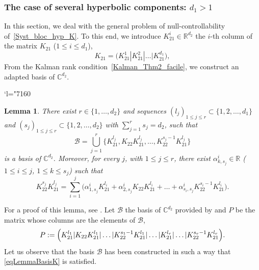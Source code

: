 \documentclass[JEP,XML,SOM,Unicode,NoEqCountersInSection]{cedram}
\let\mathcal\mathscr
\newcommand{\Changel}{\mathcode`l="7160}
\theoremstyle{plain}
\newtheorem{lemma}[theorem]{Lemma}
\theoremstyle{definition}
\theoremstyle{remark}
\newcommand{\set}{\mathbb}
\newcommand{\R}{} %
\renewcommand{\R}{\set{R}}
\renewcommand{\C}{\set{C}}
\newcommand{\coloneqq}{\mathrel{\mathord{:}\mathord=}}
\begin{document}
\subsubsection{The case of several hyperbolic components: $d_1 >1$}
\label{SectionKd1>1}

In this section, we deal with the general problem of null-controllability of~\eqref{Syst_bloc_hyp_K}. To this end, we introduce $K_{21}^i \in \R^{d_2}$ the $i$-th column of the matrix $K_{21}$ ($1 \leq i \leq d_1$), \ie
\[
K_{21} = \bigl(K_{21}^1 | K_{21}^2 | \dots | K_{21}^{d_1} \bigr),
\]
From the Kalman rank condition~\eqref{Kalman_Thm2_facile}, we construct an adapted basis of $\C^{d_2}$.

\Changel

\begin{lemma}
\label{AdaptedBasisLemma}
There exist $r \in \{1, \dots, d_2\}$ and sequences $(l_j)_{1 \leq j \leq r} \subset \{1, 2, \dots, d_1\}$ and $(s_j)_{1 \leq j \leq r} \subset \{1, 2, \dots, d_2\}$ with $\sum_{j=1}^r s_j =d_2$, such that
\[
\mathcal{B} = \bigcup\limits_{j=1}^{r} \bigl\{K_{21}^{l_j}, K_{22} K_{21}^{l_j}, \dots, K_{22}^{s_j-1} K_{21}^{l_j} \bigr\}
\]
is a basis of $\C^{d_2}$. Moreover, for every $j$, with $1 \leq j \leq r$, there exist $\alpha_{k,s_j}^i \in \R$ ($1 \leq i \leq j$, $1 \leq k \leq s_j$) such that
\begin{equation}
K_{22}^{s_j} K_{21}^{l_j} = \sum_{i=1}^j \bigl(\alpha_{1, s_j}^i K_{21}^{l_i} + \alpha_{2, s_j}^i K_{22} K_{21}^{l_i} + \dots + \alpha_{s_i,s_j}^i K_{22}^{s_i-1} K_{21}^{l_i}\bigr).
\label{eqLemmaBasisK}
\end{equation}
\end{lemma}

For a proof of this lemma, see \cite[Lem.\,3.1]{ammarkhodja_2009a}. Let $\mathcal{B}$ the basis of $\C^{d_2}$ provided by  and $P$ be the matrix whose columns are the elements of $\mathcal{B}$, \ie
\[
P \coloneqq \Bigl(K_{21}^{l_1} | K_{22} K_{21}^{l_1} | \dots | K_{22}^{s_1-1} K_{21}^{l_1}| \dots | K_{21}^{l_r} | \dots | K_{22}^{s_r-1} K_{21}^{l_r} \Bigr).
\]
Let us observe that the basis $\mathcal{B}$ has been constructed in such a way that \eqref{eqLemmaBasisK} is satisfied.
\end{document}
